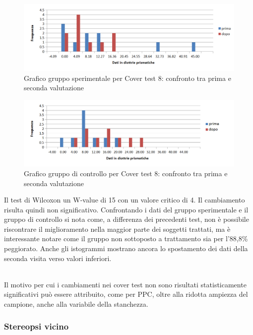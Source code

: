  \begin{figure}[h!]
	\centering
	\includegraphics[scale=0.8]{source/grafici/cover_test_8_trattati_nuovo.png}
	\caption[figure]{Grafico gruppo sperimentale per Cover test 8: confronto tra prima e seconda valutazione}
	\label{fig:issuexample}
\end{figure}
 \begin{figure}[h!]
	\centering
	\includegraphics[scale=0.8]{source/grafici/cover_test_8_giustissimo_non_trattati.png}
	\caption[figure]{Grafico gruppo di controllo per Cover test 8: confronto tra prima e seconda valutazione}
	\label{fig:issuexample}
\end{figure}

Il test di Wilcoxon un W-value di 15 con un valore critico di 4. Il cambiamento risulta quindi non significativo. Confrontando i dati del gruppo sperimentale e il gruppo di controllo si nota come, a differenza dei precedenti test, non è possibile riscontrare il miglioramento nella maggior parte dei soggetti trattati, ma è interessante notare come il gruppo non sottoposto a trattamento sia per l’88,8\% peggiorato. Anche gli istogrammi mostrano ancora lo spostamento dei dati della seconda visita verso valori inferiori. 
\\\

Il motivo per cui i cambiamenti nei cover test non sono risultati statisticamente significativi può essere attribuito, come per PPC, oltre alla ridotta ampiezza del campione, anche alla variabile della stanchezza.


\subsubsection{Stereopsi vicino}


